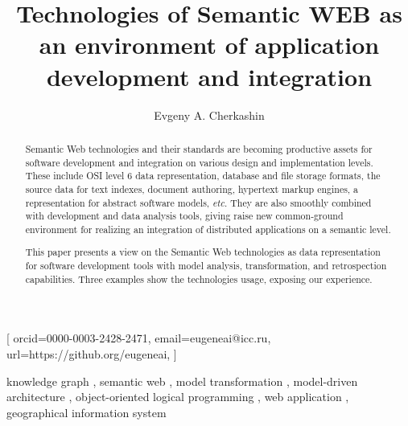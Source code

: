\documentclass[
]{ceurart}
\begin{document}


\title{Technologies of Semantic WEB as an environment of application development and integration}
\author[1,2]{Evgeny A. Cherkashin}[%
orcid=0000-0003-2428-2471,
email=eugeneai@icc.ru,
url=https://github.org/eugeneai,
]
\address[1]{Matrosov Institute for System Dynamics and Control Theory of Siberian Branch of Russian Academy of Sciences, 134 Lermontov St, Irkutsk, 664033, Russian Federation}

\address[2]{Institute for Mathematics and Information Technologies, Irkutsk State University, 20~Gagarina Bulv, Irkutsk, 664003, Russian Federation}

\begin{abstract}
  Semantic Web technologies and their standards are becoming productive assets for software development and integration on various design and implementation levels.  These include OSI level 6 data representation, database and file storage formats, the source data for text indexes, document authoring, hypertext markup engines, a representation for abstract software models, \emph{etc}.  They are also smoothly combined with development and data analysis tools, giving raise new common-ground environment for realizing an integration of distributed applications on a semantic level.

  This paper presents a view on the Semantic Web technologies as data representation for software development tools with model analysis, transformation, and retrospection capabilities.  Three examples show the technologies usage, exposing our experience.
\end{abstract}

\begin{keywords}
  knowledge graph \sep
  semantic web \sep
  model transformation \sep
  model-driven architecture \sep
  object-oriented logical programming \sep
  web application \sep
  geographical information system
\end{keywords}
\end{document}
